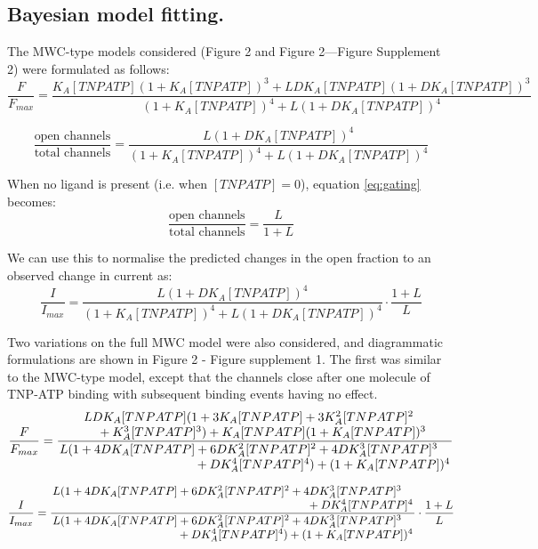 \documentclass[9pt,lineno, onehalfspacing]{elife_modified}
\begin{document}
\subsection{Bayesian model fitting.}
The MWC-type models considered (Figure 2 and Figure 2—Figure Supplement 2) were formulated as follows:
\begin{equation} \label{eq:binding}
\frac{F}{F_{max}} = \frac
    {K_A[TNPATP](1+K_A[TNPATP])^3+LDK_A[TNPATP](1+DK_A[TNPATP])^3}
    {(1+K_A[TNPATP])^4+L(1+DK_A[TNPATP])^4}
\end{equation}

\begin{equation} \label{eq:gating}
\frac{\text{open channels}}{\text{total channels}} = \frac
    {L(1+DK_A[TNPATP])^4}
    {(1+K_A[TNPATP])^4+L(1+DK_A[TNPATP])^4}
\end{equation}

When no ligand is present (i.e. when $[TNPATP] = 0$), equation \ref{eq:gating} becomes:
\begin{equation} \label{eq:intrinsic_po}
\frac{\text{open channels}}{\text{total channels}} = \frac
    {L}
    {1+L}
\end{equation}

We can use this to normalise the predicted changes in the open fraction to an observed change in current as:
\begin{equation} \label{eq:normalised_po}
\frac{I}{I_{max}} = \frac
    {L(1+DK_A[TNPATP])^4}
    {(1+K_A[TNPATP])^4+L(1+DK_A[TNPATP])^4}\cdot
   \frac
    {1+L}
    {L}
\end{equation}

Two variations on the full MWC model were also considered, and diagrammatic formulations are shown in Figure 2 - Figure supplement 1.
The first was similar to the MWC-type model, except that the channels close after one molecule of TNP-ATP binding with subsequent binding events having no effect.
\begin{equation} \label{eq:binding_2}
\frac{F}{F_{max}} = \frac{\splitfrac
    {LDK_A[TNPATP](1+3K_A[TNPATP]+3K_A^2[TNPATP]^2}
    {+K_A^3[TNPATP]^3)+K_A[TNPATP](1+K_A[TNPATP])^3}}{\splitfrac
    {L(1+4DK_A[TNPATP]+6DK_A^2[TNPATP]^2+4DK_A^3[TNPATP]^3}
    {+DK_A^4[TNPATP]^4)+(1+K_A[TNPATP])^4}}
\end{equation}

\begin{equation} \label{eq:gating_2}
\frac{I}{I_{max}} = \frac{\splitfrac
    {L(1+4DK_A[TNPATP]+6DK_A^2[TNPATP]^2+4DK_A^3[TNPATP]^3}
    {+DK_A^4[TNPATP]^4}}{\splitfrac
    {L(1+4DK_A[TNPATP]+6DK_A^2[TNPATP]^2+4DK_A^3[TNPATP]^3}
    {+DK_A^4[TNPATP]^4)+(1+K_A[TNPATP])^4}}\cdot
   \frac
    {1+L}
    {L}
\end{equation}
\end{document}
